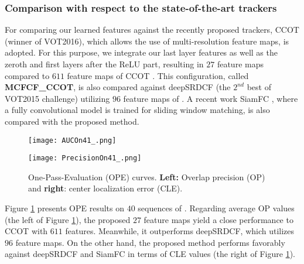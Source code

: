 \documentclass[journal]{IEEEtran}
\begin{document}
\subsubsection{Comparison with respect to the state-of-the-art trackers}
For comparing our learned features against the recently proposed trackers, CCOT \cite{CCOT} (winner of VOT2016), which allows the use of multi-resolution feature maps, is adopted. For this purpose, we integrate our last layer features as well as the zeroth and first layers after the ReLU part, resulting in $27$ feature maps compared to $611$ feature maps of CCOT \cite{CCOT}. This configuration, called \textbf{MCFCF\_CCOT}, is also compared against deepSRDCF \cite{deepSRDCF} (the $2^{nd}$ best of VOT2015 challenge) utilizing $96$ feature maps of \cite{VGG}. A recent work SiamFC \cite{SiamFC}, where a fully convolutional model is trained for sliding window matching, is also compared with the proposed method.

\begin{figure}
\begin{minipage}[t]{0.495\linewidth}
\centering
\texttt{[image: AUCOn41\_.png]} 
\end{minipage}
\hfill
\begin{minipage}[t]{0.495\linewidth}
\centering
\texttt{[image: PrecisionOn41\_.png]} 
\end{minipage}
\caption{\label{OPEFIG}\small One-Pass-Evaluation (OPE) curves. \textbf{Left:} Overlap precision (OP) and \textbf{right}: center localization error (CLE).}
\end{figure}
\normalsize
Figure \ref{OPEFIG} presents OPE results on $40$ sequences of \cite{Benchmark2013}. Regarding average OP values (the left of Figure \ref{OPEFIG}), the proposed $27$ feature maps yield a close performance to CCOT with $611$ features. Meanwhile, it outperforms deepSRDCF, which utilizes $96$ feature maps. On the other hand, the proposed method performs favorably against deepSRDCF and SiamFC in terms of CLE values (the right of Figure \ref{OPEFIG}).
\end{document}
